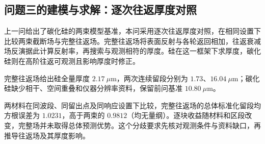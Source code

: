 \subsection{问题三的建模与求解：逐次往返厚度对照}

上一问给出了碳化硅的两束模型基准，本问采用逐次往返厚度对照，在相同设置下比较两束截断场与完整往返场。完整往返场将表面反射与各轮返回相加，往返衰减场反演据此计算反射率，再搜索与观测相符的厚度。硅在这一框架下求厚度，碳化硅则在高阶往返可观测且影响厚度时修正。

完整往返场给出硅全量厚度 $2.17\ \mu\mathrm{m}$，两次连续留段分别为 $1.73$、$16.04\ \mu\mathrm{m}$；碳化硅缺少相干、空间重叠和仪器分辨率资料，保留前问基准 $10.80\ \mu\mathrm{m}$。

两材料在同波段、同留出点及同响应设置下比较，完整往返场的总体标准化留段均方根误差为 $1.0231$，高于两束的 $0.9812$（均无量纲）。逐块收益随材料和区段改变，完整场并未取得总体预测优势。这个分歧要求先核对观测条件与资料缺口，再推导往返场及其厚度影响。
